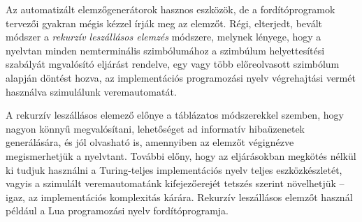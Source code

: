 Az automatizált elemzőgenerátorok hasznos eszközök, de a fordítóprogramok tervezői gyakran mégis kézzel írják meg az elemzőt.
Régi, elterjedt, bevált módszer a \textit{rekurzív leszállásos elemzés} módszere, melynek lényege, hogy a nyelvtan minden nemterminális szimbólumához a szimbúlum helyettesítési szabályát mgvalósító eljárást rendelve, egy vagy több előreolvasott szimbólum alapján döntést hozva, az implementációs programozási nyelv végrehajtási vermét használva szimulálunk veremautomatát.

A rekurzív leszállásos elemező előnye a táblázatos módszerekkel szemben, hogy nagyon könnyű megvalósítani, lehetőséget ad informatív hibaüzenetek generálására, és jól olvasható is, amennyiben az elemzőt végignézve megismerhetjük a nyelvtant.
További előny, hogy az eljárásokban megkötés nélkül ki tudjuk használni a Turing-teljes implementációs nyelv teljes eszközkészletét, vagyis a szimulált veremautomatánk kifejezőerejét tetszés szerint növelhetjük -- igaz, az implementációs komplexitás kárára.
Rekurzív leszállásos elemzőt használ például a Lua programozási nyelv fordítóprogramja.



